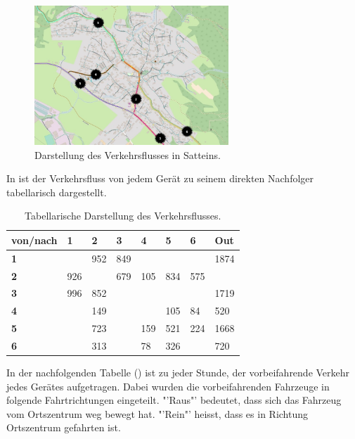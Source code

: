 \begin{figure}[H]
  \centering
  \includegraphics[width=0.65\textwidth]{Resultate/Auswertung.jpg} 
  \caption{Darstellung des Verkehrsflusses in Satteins.}
  \label{bAuswertung}
\end{figure}
In  ist der Verkehrsfluss von jedem Gerät zu seinem direkten Nachfolger tabellarisch dargestellt. 

\setlength\tabcolsep{5pt}

\begin{table}[H]
\centering
\begin{tabular}{|p{1.5cm}|p{1.5cm}|p{1.5cm}|p{1.5cm}|p{1.5cm}|p{1.5cm}|p{1.5cm}|p{1.5cm}|}
\hline
	\textbf{von/nach} & \textbf{1} & \textbf{2} & \textbf{3} & \textbf{4} & \textbf{5} & \textbf{6} & \textbf{Out} \\ \hline
	\textbf{1} &  & 952 & 849 &  &  &  & 1874 \\ \hline
	\textbf{2} & 926 &  & 679 & 105 & 834 & 575 &  \\ \hline
	\textbf{3} & 996 & 852 &  &  & &  & 1719 \\ \hline
	\textbf{4} &  & 149 &  &  & 105 & 84 & 520 \\ \hline
	\textbf{5} &  & 723 &  & 159 & 521 & 224 & 1668 \\ \hline
	\textbf{6} &  & 313 &  & 78 & 326 &  & 720 \\ \hline
\end{tabular}
\caption{Tabellarische Darstellung des Verkehrsflusses.}
\label{tVerkehrsfluss}
\end{table}
\setlength\tabcolsep{0pt}

In der nachfolgenden Tabelle () ist zu jeder Stunde, der vorbeifahrende Verkehr jedes Gerätes aufgetragen. Dabei wurden die vorbeifahrenden Fahrzeuge in folgende Fahrtrichtungen eingeteilt. "'Raus"' bedeutet, dass sich das Fahrzeug vom Ortszentrum weg bewegt hat. "'Rein"' heisst, dass es in Richtung Ortszentrum gefahrten ist.

